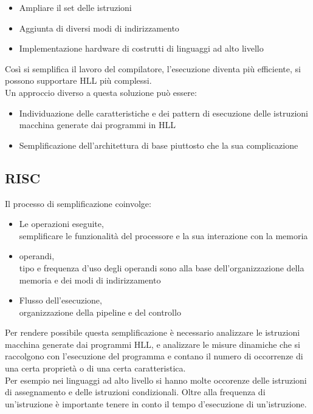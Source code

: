 \documentclass[arch.tex]{subfiles}
\begin{document}
\begin{itemize}
	\item Ampliare il set delle istruzioni
	\item Aggiunta di diversi modi di indirizzamento
	\item Implementazione hardware di costrutti di linguaggi ad alto livello
\end{itemize}
Così si semplifica il lavoro del compilatore, l'esecuzione diventa più efficiente, si possono
supportare HLL più complessi.\\
Un approccio diverso a questa soluzione può essere:

\begin{itemize}
	\item Individuazione delle caratteristiche e dei pattern di esecuzione delle istruzioni
		macchina generate dai programmi in HLL
	\item Semplificazione dell'architettura di base piuttosto che la sua complicazione
\end{itemize}

\subsection{RISC}%
\label{sub:risc}

Il processo di semplificazione coinvolge:

\begin{itemize}
	\item Le operazioni eseguite,\\
		semplificare le funzionalità del processore e la sua interazione con la memoria
	\item operandi,\\
		tipo e frequenza d'uso degli operandi sono alla base dell'organizzazione
		della memoria e dei modi di indirizzamento
	\item Flusso dell'esecuzione,\\
		organizzazione della pipeline e del controllo
\end{itemize}
Per rendere possibile questa semplificazione è necessario analizzare le istruzioni macchina 
generate dai programmi HLL, e analizzare le misure dinamiche che si raccolgono con l'esecuzione
del programma e contano il numero di occorrenze di una certa proprietà o di una certa 
caratteristica.\\
Per esempio nei linguaggi ad alto livello si hanno molte occorenze delle istruzioni di 
assegnamento e delle istruzioni condizionali. Oltre alla frequenza di un'istruzione
è importante tenere in conto il tempo d'esecuzione di un'istruzione.
\end{document}
